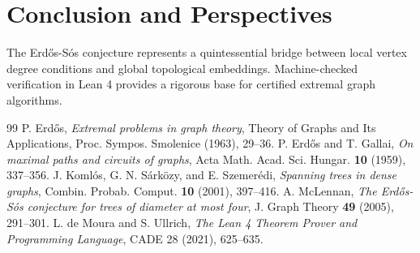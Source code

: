 \documentclass[11pt,a4paper]{article}
\theoremstyle{definition}
\begin{document}
\section{Conclusion and Perspectives}
The Erd\H{o}s-S\'os conjecture represents a quintessential bridge between local vertex degree conditions and global topological embeddings. Machine-checked verification in Lean 4 provides a rigorous base for certified extremal graph algorithms.

\begin{thebibliography}{99}
 P. Erd\H{o}s, \textit{Extremal problems in graph theory}, Theory of Graphs and Its Applications, Proc. Sympos. Smolenice (1963), 29--36.
 P. Erd\H{o}s and T. Gallai, \textit{On maximal paths and circuits of graphs}, Acta Math. Acad. Sci. Hungar. \textbf{10} (1959), 337--356.
 J. Koml\'os, G. N. S\'ark\"ozy, and E. Szemer\'edi, \textit{Spanning trees in dense graphs}, Combin. Probab. Comput. \textbf{10} (2001), 397--416.
 A. McLennan, \textit{The Erd\H{o}s-S\'os conjecture for trees of diameter at most four}, J. Graph Theory \textbf{49} (2005), 291--301.
 L. de Moura and S. Ullrich, \textit{The Lean 4 Theorem Prover and Programming Language}, CADE 28 (2021), 625--635.
\end{thebibliography}
\end{document}

